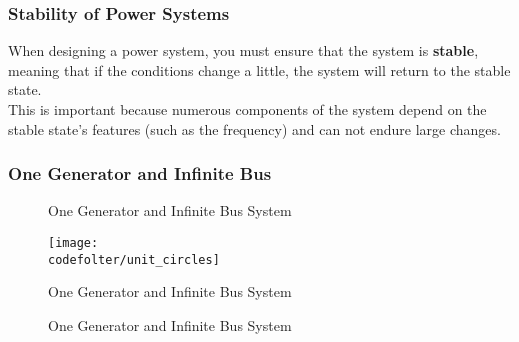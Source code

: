 \documentclass[12pt,English]{article}
\begin{document}
\subsubsection{Stability of Power Systems}
When designing a power system, you must ensure that the system is \textbf{stable}, meaning that if the conditions change a little, the system will return to the stable state. \\
This is important because numerous components of the system depend on the stable state's features (such as the frequency) and can not endure large changes.  


\subsubsection{One Generator and Infinite Bus}

\begin{figure}[H]
\begin{center}

\end{center}
\caption{One Generator and Infinite Bus System}
\end{figure}


\begin{figure}[H]
\begin{center}
\texttt{[image: \\codefolter/unit\_circles]}
\end{center}
\caption{One Generator and Infinite Bus System}
\end{figure}

\begin{figure}[H]
\begin{center}

\end{center}
\caption{One Generator and Infinite Bus System}
\end{figure}

\end{document}
